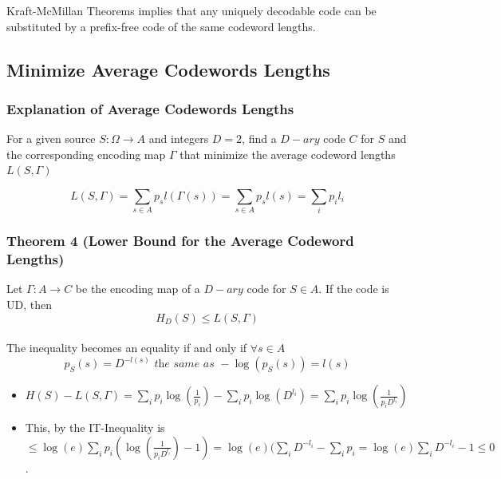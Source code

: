 \documentclass{article}
\begin{document}
\begin{tcolorbox}[width=12.1cm, leftrule=3mm]
Kraft-McMillan Theorems implies that any uniquely decodable code can be substituted by a prefix-free code of the same codeword lengths.
\end{tcolorbox}

\subsection{Minimize Average Codewords Lengths}
\subsubsection{Explanation of Average Codewords Lengths} For a given source $ S: \Omega \rightarrow A $ and integers $ D = 2 $, find a $ D-ary $ code $ C $ for $ S $ and the corresponding encoding map $ \Gamma $ that minimize the average codeword lengths $ L(S, \Gamma) $

\begin{tcolorbox}[sharp corners, colback=green!30, colframe=green!80!blue, title=Definition of Average Codeword Lengths]
\begin{equation}
L(S, \Gamma) = \sum_{s \in A}p_{s}l(\Gamma(s)) = \sum_{s \in A}p_{s}l(s) = \sum_{i}p_{i}l_{i} 
\end{equation}
\end{tcolorbox}

\subsubsection{Theorem 4 (Lower Bound for the Average Codeword Lengths)} Let $ \Gamma: A \rightarrow C $ be the encoding map of a $ D-ary $ code for $ S \in A $. If the code is UD, then
\begin{equation}
H_D(S) \leq L(S, \Gamma)
\end{equation}
\\
The inequality becomes an equality if and only if $ \forall s \in A $
\begin{equation}
p_{S}(s) = D^{-l(s)} \textit{ the same as } -\log(p_{S}(s)) = l(s)
\end{equation}

\begin{tcolorbox}[width=12.1cm]
\begin{itemize}
\item $ H(S) - L(S,\Gamma) = \sum_{i}p_i\log(\frac{1}{p_i}) - \sum_{i}p_i\log(D^{l_i}) =  \sum_{i}p_i\log(\frac{1}{p_{i}D^{l_i}}) $
\item This, by the IT-Inequality is $ \leq \log(e)\sum_{i}p_i(\log(\frac{1}{p_{i}D^{l_i}}) - 1)  = \log(e)(\sum_{i}D^{-l_i} - \sum_{i}p_i = \log(e)\sum_{i}D^{-l_i} - 1 \leq 0 $.
\end{itemize}
\end{tcolorbox}
\end{document}
